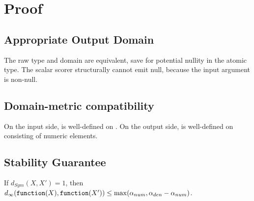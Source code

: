\documentclass{article}
\begin{document}
\section{Proof}
\subsection{Appropriate Output Domain}
\label{sec:approp-output-domain}
The raw type and domain are equivalent, save for potential nullity in the atomic type. 
The scalar scorer structurally cannot emit null, because the input argument is non-null.

\subsection{Domain-metric compatibility}
On the input side,  is well-defined on . 
On the output side,  is well-defined on  consisting of numeric elements.

\subsection{Stability Guarantee}

\begin{lemma}
    \label{single-change-stab}
    If $d_{Sym}(X, X') = 1$, then $d_\infty(\texttt{function}(X), \texttt{function}(X')) \le \max(\alpha_{num}, \alpha_{den} - \alpha_{num})$.
\end{lemma}
\end{document}
